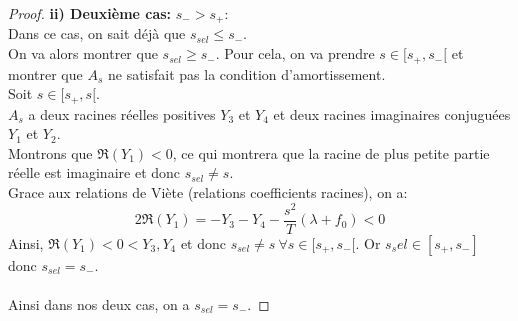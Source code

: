 \documentclass[11pt]{article}
\begin{document}
\begin{proof}
\textbf{ii) Deuxième cas:} $s_- > s_+$:\\
Dans ce cas, on sait déjà que $s_{sel} \leq s_{-}$.\\
On va alors montrer que $s_{sel} \geq s_{-}$. Pour cela, on va prendre $s \in [s_{+},s_-[$ et montrer que $A_s$ ne satisfait pas la condition d'amortissement.\\
Soit $s\in [s_{+},s[$.\\
 $A_s$ a deux racines réelles positives $Y_3$ et $Y_4$ et deux racines imaginaires conjuguées $Y_1$ et $Y_2$. \\ 
Montrons que $\Re(Y_1)<0$, ce qui montrera que la racine de plus petite partie réelle est imaginaire et donc $s_{sel} \not = s$.\\
Grace aux relations de Viète (relations coefficients racines), on a:\\
\begin{equation}
	2\Re(Y_1)  =  -Y_3 - Y_4 - \frac{s^2}{T}(\lambda + f_0)	 <0
\end{equation}
Ainsi, $\Re(Y_1)<0<Y_3,Y_4$ et donc $s_{sel} \not = s \ \forall s \in [s_{+},s_-[$. Or $s_sel \in [s_{+},s_-]$ donc \underline{$s_{sel} = s_-$}.\\
\ \\
Ainsi dans nos deux cas, on a \underline{$s_{sel} = s_-$}.

\end{proof}
\ifdefined\COMPLETE
\else
\end{document}
